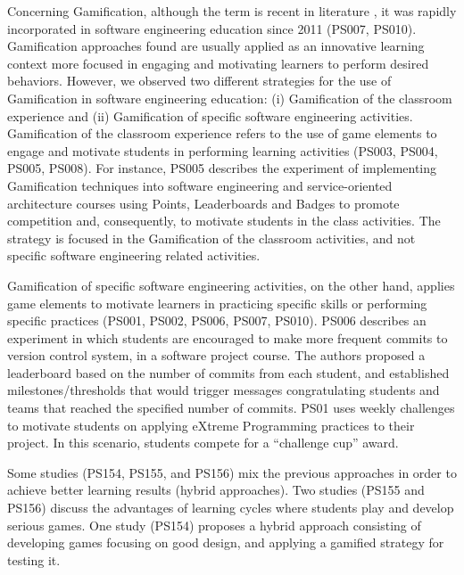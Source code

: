 Concerning Gamification, although the term is recent in literature \citep{Deterding:2011}, it was rapidly incorporated in software engineering education since 2011 (PS007, PS010). Gamification approaches found are usually applied as an innovative learning context more focused in engaging and motivating learners to perform desired behaviors. However, we observed two different strategies for the use of Gamification in software engineering education: (i) Gamification of the classroom experience and (ii) Gamification of specific software engineering activities. Gamification of the classroom experience refers to the use of game elements to engage and motivate students in performing learning activities (PS003, PS004, PS005, PS008). For instance, PS005 describes the experiment of implementing Gamification techniques into software engineering and service-oriented architecture courses using Points, Leaderboards and Badges to promote competition and, consequently, to motivate students in the class activities. The strategy is focused in the Gamification of the classroom activities, and not specific software engineering related activities. 

Gamification of specific software engineering activities, on the other hand, applies game elements to motivate learners in practicing specific skills or performing specific practices (PS001, PS002, PS006, PS007, PS010). PS006 describes an experiment in which students are encouraged to make more frequent commits to version control system, in a software project course. The authors proposed a leaderboard based on the number of commits from each student, and established milestones/thresholds that would trigger messages congratulating students and teams that reached the specified number of commits. PS01 uses weekly challenges to motivate students on applying eXtreme Programming practices to their project. In this scenario, students compete for a “challenge cup” award.

Some studies (PS154, PS155, and PS156) mix the previous approaches in order to achieve better learning results (hybrid approaches). Two studies (PS155 and PS156) discuss the advantages of learning cycles where students play and develop serious games. One study (PS154) proposes a hybrid approach consisting of developing games focusing on good design, and applying a gamified strategy for testing it.

